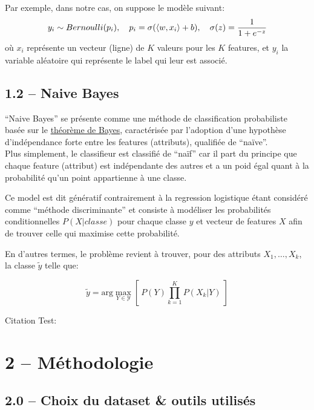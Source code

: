 \documentclass[
]{article}
\begin{document}
Par exemple, dans notre cas, on suppose le modèle suivant: \[
y_i \sim Bernoulli(p_i),\quad p_i = \sigma(\langle w, x_i \rangle + b),\quad \sigma(z) = \frac{1}{1 + e^{-z}}
\] où \(x_i\) représente un vecteur (ligne) de \(K\) valeurs pour les
\(K\) features, et \(y_i\) la variable aléatoire qui représente le label
qui leur est associé.

\hypertarget{naive-bayes}{%
\subsection{1.2 -- Naive Bayes}\label{naive-bayes}}

``Naive Bayes'' se présente comme une méthode de classification
probabiliste basée sur le
\href{https://en.wikipedia.org/wiki/Bayes\%27_theorem}{théorème de
Bayes}, caractérisée par l'adoption d'une hypothèse d'indépendance forte
entre les features (attributs), qualifiée de ``naïve''.\\
Plus simplement, le classifieur est classifié de ``naïf'' car il part du
principe que chaque feature (attribut) est indépendante des autres et a
un poid égal quant à la probabilité qu'un point appartienne à une
classe.

Ce model est dit génératif contrairement à la regression logistique
étant considéré comme ``méthode discriminante''
\cite{ClassifieurLineaire2022} et consiste à modéliser les probabilités
conditionnelles \(P(X | classe)\) pour chaque classe \(y\) et vecteur de
features \(X\) afin de trouver celle qui maximise cette probabilité.

En d'autres termes, le problème revient à trouver, pour des attributs
\(X_1, \ldots, X_k\), la classe \(\tilde{y}\) telle que:

\[
\tilde{y} = \text{arg}\max_{Y \in \mathcal{Y}} \left[\  P(Y) \prod_{k = 1}^K{P(X_k | Y)}\  \right]
\]

Citation Test: \cite{LinearModels}

\hypertarget{muxe9thodologie}{%
\section{2 -- Méthodologie}\label{muxe9thodologie}}

\hypertarget{choix-du-dataset-outils-utilisuxe9s}{%
\subsection{2.0 -- Choix du dataset \& outils
utilisés}\label{choix-du-dataset-outils-utilisuxe9s}}
\end{document}
